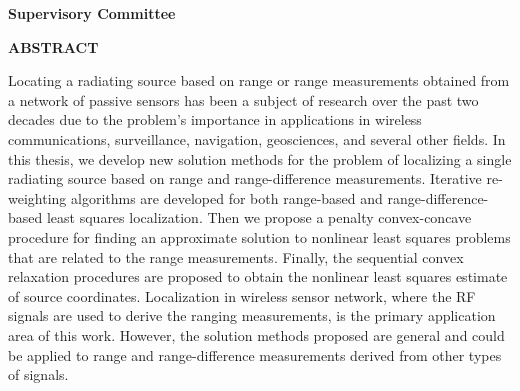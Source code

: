 \newpage
{}

\noindent \textbf{Supervisory Committee}
\tpbreak
\panel

\begin{center}
\textbf{ABSTRACT}
\end{center}


Locating a radiating source based on range or range measurements obtained from a network of passive sensors has been a subject of research over the past two decades due to the problem's importance in applications in wireless communications, surveillance, navigation, geosciences, and several other fields. In this thesis, we develop  new solution methods for the problem of localizing a single radiating source based on range and range-difference measurements. Iterative re-weighting algorithms are developed for both range-based and range-difference-based least squares localization. Then we propose a penalty convex-concave procedure for finding an approximate solution to nonlinear least squares problems  that are related to the range measurements. Finally, the sequential convex relaxation procedures are proposed to obtain the nonlinear least squares estimate of source coordinates. Localization in wireless sensor network, where the RF signals are used to derive the ranging measurements,  is the primary application area of this work. However, the solution methods proposed are general and could be applied to range and range-difference measurements derived from other types of signals. 